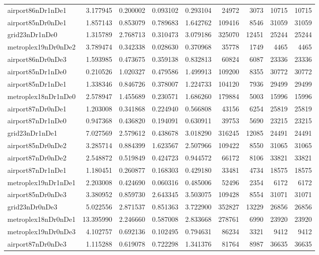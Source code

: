 \begin{longtable}{|l|r|r|r|r|r|r|r|r|}
airport86nDr1nDe1 & 3.177945 & 0.200002 & 0.093102 & 0.293104 & 24972 & 3073 & 10715 & 10715 \\
airport85nDr0nDe1 & 1.857143 & 0.853079 & 0.789683 & 1.642762 & 109416 & 8546 & 31059 & 31059 \\
grid23nDr1nDe0 & 1.315789 & 2.768713 & 0.310473 & 3.079186 & 325070 & 12451 & 25244 & 25244 \\
metroplex19nDr0nDe2 & 3.789474 & 0.342338 & 0.028630 & 0.370968 & 35778 & 1749 & 4465 & 4465 \\
airport86nDr0nDe3 & 1.593985 & 0.473675 & 0.359138 & 0.832813 & 60824 & 6087 & 23336 & 23336 \\
airport85nDr1nDe0 & 0.210526 & 1.020327 & 0.479586 & 1.499913 & 109200 & 8355 & 30772 & 30772 \\
airport85nDr1nDe1 & 1.338346 & 0.846726 & 0.378007 & 1.224733 & 104120 & 7936 & 29499 & 29499 \\
metroplex18nDr1nDe0 & 2.578947 & 1.455689 & 0.230571 & 1.686260 & 179884 & 5003 & 15996 & 15996 \\
airport87nDr0nDe1 & 1.203008 & 0.341868 & 0.224940 & 0.566808 & 43156 & 6254 & 25819 & 25819 \\
airport87nDr1nDe0 & 0.947368 & 0.436820 & 0.194091 & 0.630911 & 39753 & 5690 & 23215 & 23215 \\
grid23nDr1nDe1 & 7.027569 & 2.579612 & 0.438678 & 3.018290 & 316245 & 12085 & 24491 & 24491 \\
airport85nDr0nDe2 & 3.285714 & 0.884399 & 1.623567 & 2.507966 & 109422 & 8550 & 31065 & 31065 \\
airport87nDr0nDe2 & 2.548872 & 0.519849 & 0.424723 & 0.944572 & 66172 & 8106 & 33821 & 33821 \\
airport87nDr1nDe1 & 1.180451 & 0.260877 & 0.168303 & 0.429180 & 33481 & 4734 & 18575 & 18575 \\
metroplex19nDr1nDe1 & 2.203008 & 0.424690 & 0.060316 & 0.485006 & 52496 & 2354 & 6172 & 6172 \\
airport85nDr0nDe3 & 3.380952 & 0.859730 & 2.643345 & 3.503075 & 109428 & 8554 & 31071 & 31071 \\
grid23nDr0nDe3 & 5.022556 & 2.871537 & 0.851363 & 3.722900 & 352827 & 13229 & 26856 & 26856 \\
metroplex18nDr0nDe1 & 13.395990 & 2.246660 & 0.587008 & 2.833668 & 278761 & 6990 & 23920 & 23920 \\
metroplex19nDr0nDe3 & 4.102757 & 0.692136 & 0.102495 & 0.794631 & 86234 & 3321 & 9412 & 9412 \\
airport87nDr0nDe3 & 1.115288 & 0.619078 & 0.722298 & 1.341376 & 81764 & 8987 & 36635 & 36635 \\

\end{longtable}
